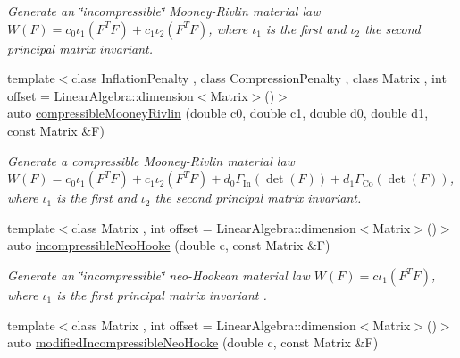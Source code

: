\begin{DoxyCompactItemize}
\begin{DoxyCompactList}\small\item\em Generate an \char`\"{}incompressible\char`\"{} Mooney-\/\-Rivlin material law $ W(F)=c_0\iota_1(F^T F) + c_1\iota_2(F^T F) $, where $\iota_1$ is the first and $\iota_2$ the second principal matrix invariant. \end{DoxyCompactList}\item 
\hypertarget{group__Rubber_ga1522c73c1e2eec5516b73b203150c7e1}{{\footnotesize template$<$class Inflation\-Penalty , class Compression\-Penalty , class Matrix , int offset = Linear\-Algebra\-::dimension$<$\-Matrix$>$()$>$ }\\auto \hyperlink{group__Rubber_ga1522c73c1e2eec5516b73b203150c7e1}{compressible\-Mooney\-Rivlin} (double c0, double c1, double d0, double d1, const Matrix \&F)}\label{group__Rubber_ga1522c73c1e2eec5516b73b203150c7e1}

\begin{DoxyCompactList}\small\item\em Generate a compressible Mooney-\/\-Rivlin material law $ W(F)=c_0\iota_1(F^T F) + c_1\iota_2(F^T F) + d_0\Gamma_\mathrm{In}(\det(F))+d_1\Gamma_\mathrm{Co}(\det(F)) $, where $\iota_1$ is the first and $\iota_2$ the second principal matrix invariant. \end{DoxyCompactList}\item 
\hypertarget{group__Rubber_ga554b9bf515aa99d3bdc9e230f2a65bca}{{\footnotesize template$<$class Matrix , int offset = Linear\-Algebra\-::dimension$<$\-Matrix$>$()$>$ }\\auto \hyperlink{group__Rubber_ga554b9bf515aa99d3bdc9e230f2a65bca}{incompressible\-Neo\-Hooke} (double c, const Matrix \&F)}\label{group__Rubber_ga554b9bf515aa99d3bdc9e230f2a65bca}

\begin{DoxyCompactList}\small\item\em Generate an \char`\"{}incompressible\char`\"{} neo-\/\-Hookean material law $ W(F)=c\iota_1(F^T F) $, where $\iota_1$ is the first principal matrix invariant . \end{DoxyCompactList}\item 
\hypertarget{group__Rubber_ga1b6f97c769ead09a5b1dcdf4733e85aa}{{\footnotesize template$<$class Matrix , int offset = Linear\-Algebra\-::dimension$<$\-Matrix$>$()$>$ }\\auto \hyperlink{group__Rubber_ga1b6f97c769ead09a5b1dcdf4733e85aa}{modified\-Incompressible\-Neo\-Hooke} (double c, const Matrix \&F)}\label{group__Rubber_ga1b6f97c769ead09a5b1dcdf4733e85aa}


\end{DoxyCompactItemize}
